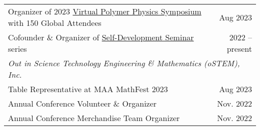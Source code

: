\documentclass[letterpaper,11pt]{article}
\begin{document}
\begin{longtable}{@{}p{}r@{}}
  \hspace{7mm} Organizer of 2023 \href{https://sites.google.com/view/polymerphysics/vpps-2023-schedule}{Virtual Polymer Physics Symposium} with 150 Global Attendees                                              & Aug 2023                                                                    \\ [3pt]
  \hspace{7mm} Cofounder \& Organizer of \href{https://sites.google.com/view/polymerphysics/self-dev-seminars}{Self-Development Seminar} series                                                                   & 2022 -- present                                                             \\ [4pt]
  \multicolumn{2}{l}{\hspace{1mm} \textit{Out in Science Technology Engineering \& Mathematics (oSTEM), Inc.}}                                                                                                                                                                                  \\ [3pt]
  \hspace{7mm} Table Representative at MAA MathFest 2023                                                                                                                                                          & Aug 2023                                                                    \\ [3pt]
  \hspace{7mm} Annual Conference Volunteer \& Organizer                                                                                                                                                           & Nov. 2022                                                                   \\ [3pt]
  \hspace{7mm} Annual Conference Merchandise Team Organizer                                                                                                                                                       & Nov. 2022                                                                   \\ [8pt]


\end{longtable}
\end{document}
